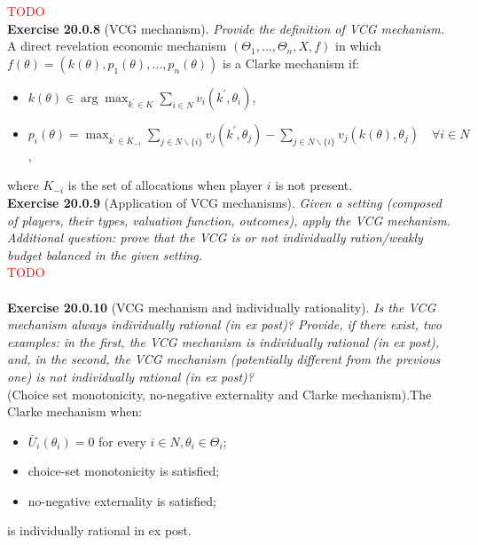\textcolor{red}{TODO}\\

\textbf{Exercise 20.0.8} (VCG mechanism). \textit{Provide the definition of VCG mechanism.}\\

A direct revelation economic mechanism $\left(\Theta_{1}, \ldots, \Theta_{n}, X, f\right)$ in which $f(\theta)=\left(k(\theta), p_{1}(\theta), \ldots, p_{n}(\theta)\right)$ is a Clarke mechanism if:
\begin{itemize}
\item $k(\theta) \in \arg \max _{k^{\prime} \in K} \sum_{i \in N} v_{i}\left(k^{\prime}, \theta_{i}\right)$,
\item $p_{i}(\theta)=\max _{k^{\prime} \in K_{-i}} \sum_{j \in N \backslash\{i\}} v_{j}\left(k^{\prime}, \theta_{j}\right)-\sum_{j \in N \backslash\{i\}} v_{j}\left(k(\theta), \theta_{j}\right) \quad \forall i \in N$,
\end{itemize}
where $K_{-i}$ is the set of allocations when player $i$ is not present.\\

\textbf{Exercise 20.0.9} (Application of VCG mechanisms). \textit{Given a setting (composed of players, their types, valuation function, outcomes), apply the VCG mechanism. Additional question: prove that the VCG is or not individually ration/weakly budget balanced in the given setting.}\\

\textcolor{red}{TODO}\\\\

\textbf{Exercise 20.0.10} (VCG mechanism and individually rationality). \textit{Is the VCG mechanism always individually rational (in ex post)? Provide, if there exist, two examples: in the first, the VCG mechanism is individually rational (in ex post), and, in the second, the VCG mechanism (potentially different from the previous one) is not individually rational (in ex post)?}\\

(Choice set monotonicity, no-negative externality and Clarke mechanism).The Clarke mechanism when:
\begin{itemize}
\item $\bar{U}_i (\theta_i) = 0$ for every $i \in N, \theta_i \in \Theta_i$;
\item choice-set monotonicity is satisfied;
\item no-negative externality is satisfied;
\end{itemize}
is individually rational in ex post.\\

